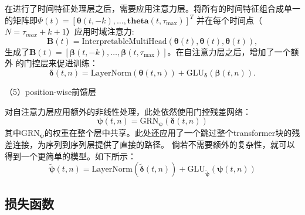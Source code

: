 在进行了时间特征处理层之后，需要应用注意力层。将所有的时间特征组合成单一的矩阵即$\bm{\varPhi }(t) = \left[ \bm{\theta} (t, -k), \ldots, \bm{theta }(t, \tau_{\text{max}}) \right]^T$
并在每个时间点（$N = \tau _{max} + k + 1$）应用时域注意力:
\begin{equation}
    \mathbf{B}(t) = \text{InterpretableMultiHead}(\mathbf{\theta }(t), \mathbf{\theta }(t), \mathbf{\theta }(t)),
\end{equation}
生成了$\mathbf{B}(t) = \left[ \mathbf{\beta }(t, -k), \ldots, \mathbf{\beta }(t, \tau_{\max}) \right]$。在自注意力层之后，增加了一个额外
的门控层来促进训练：
\begin{equation}
    \boldsymbol{\delta}(t, n) = \text{LayerNorm}(\boldsymbol{\theta }(t, n)) + \text{GLU}_{\boldsymbol{\delta}}(\boldsymbol{\beta}(t, n)).
\end{equation}

（5）position-wise前馈层

对自注意力层应用额外的非线性处理，此处依然使用门控残差网络：
\begin{equation}
    \boldsymbol{\psi}(t, n) = \text{GRN}_{\boldsymbol{\psi}}(\boldsymbol{\delta}(t, n))
\end{equation}
其中$ \text{GRN}_{\boldsymbol{\psi}}$的权重在整个层中共享。此处还应用了一个跳过整个transformer块的残差连接，为序列到序列层提供了直接的路径。
倘若不需要额外的复杂性，就可以得到一个更简单的模型。如下所示：
\begin{equation}
    \tilde{\boldsymbol{\psi}}(t, n) = \text{LayerNorm}(\tilde{\boldsymbol{\delta}}(t, n)) + \text{GLU}_{\tilde{\boldsymbol{\psi}}}({\boldsymbol{\psi}}(t, n))
\end{equation}

\subsection{损失函数}

